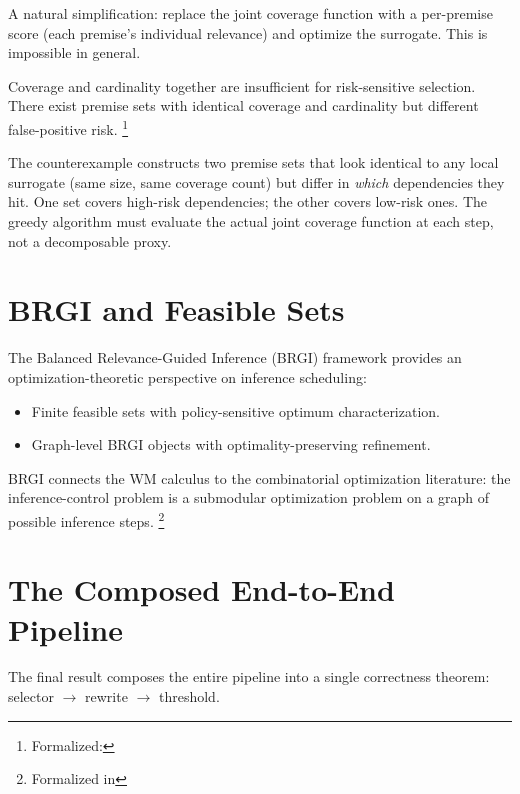 \documentclass[11pt,openany]{report}
\begin{document}
A natural simplification: replace the joint coverage function with
a per-premise score (each premise's individual relevance) and optimize
the surrogate.  This is impossible in general.

\boundarystart
\begin{theorem}
\label{thm:surrogate-no-go}
Coverage and cardinality together are insufficient for risk-sensitive
selection.  There exist premise sets with identical coverage and
cardinality but different false-positive risk.%
\footnote{Formalized:
}
\end{theorem}
\boundaryend

\noindent
The counterexample constructs two premise sets that look identical to
any local surrogate (same size, same coverage count) but differ in
\emph{which} dependencies they hit.  One set covers high-risk
dependencies; the other covers low-risk ones.  The greedy algorithm
must evaluate the actual joint coverage function at each step, not a
decomposable proxy.


\section{BRGI and Feasible Sets}

The Balanced Relevance-Guided Inference (BRGI) framework provides an
optimization-theoretic perspective on inference scheduling:
\begin{itemize}
\item Finite feasible sets with policy-sensitive optimum
  characterization.
\item Graph-level BRGI objects with optimality-preserving refinement.
\end{itemize}

\noindent
BRGI connects the WM calculus to the combinatorial optimization
literature: the inference-control problem is a submodular optimization
problem on a graph of possible inference steps.%
\footnote{Formalized in
}


\section{The Composed End-to-End Pipeline}
\label{sec:composed-pipeline}

The final result composes the entire pipeline into a single
correctness theorem: selector $\to$ rewrite $\to$ threshold.
\end{document}

